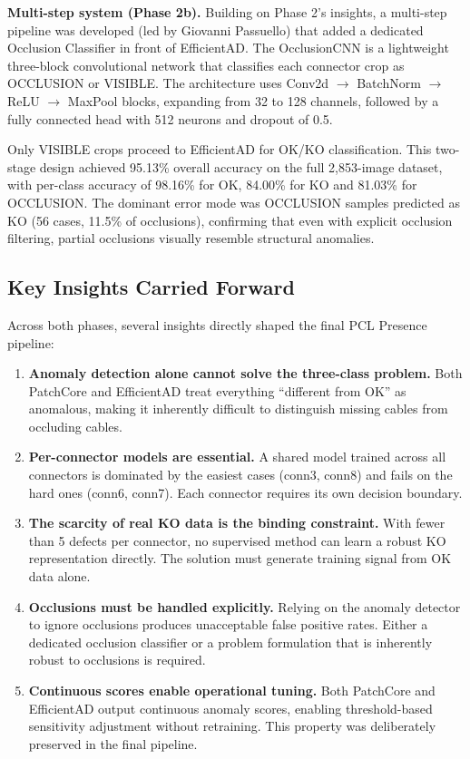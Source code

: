 \documentclass[11pt,a4paper]{article}
\begin{document}
\textbf{Multi-step system (Phase 2b).} Building on Phase 2's insights, a multi-step pipeline was developed (led by Giovanni Passuello) that added a dedicated Occlusion Classifier in front of EfficientAD. The OcclusionCNN is a lightweight three-block convolutional network that classifies each connector crop as OCCLUSION or VISIBLE. The architecture uses Conv2d $\to$ BatchNorm $\to$ ReLU $\to$ MaxPool blocks, expanding from 32 to 128 channels, followed by a fully connected head with 512 neurons and dropout of 0.5. 

Only VISIBLE crops proceed to EfficientAD for OK/KO classification. This two-stage design achieved 95.13\% overall accuracy on the full 2{,}853-image dataset, with per-class accuracy of 98.16\% for OK, 84.00\% for KO and 81.03\% for OCCLUSION. The dominant error mode was OCCLUSION samples predicted as KO (56 cases, 11.5\% of occlusions), confirming that even with explicit occlusion filtering, partial occlusions visually resemble structural anomalies.

\subsection{Key Insights Carried Forward}

Across both phases, several insights directly shaped the final PCL Presence pipeline:

\begin{enumerate}[nosep]
    \item \textbf{Anomaly detection alone cannot solve the three-class problem.} Both PatchCore and EfficientAD treat everything ``different from OK'' as anomalous, making it inherently difficult to distinguish missing cables from occluding cables.
    \item \textbf{Per-connector models are essential.} A shared model trained across all connectors is dominated by the easiest cases (conn3, conn8) and fails on the hard ones (conn6, conn7). Each connector requires its own decision boundary.
    \item \textbf{The scarcity of real KO data is the binding constraint.} With fewer than 5 defects per connector, no supervised method can learn a robust KO representation directly. The solution must generate training signal from OK data alone.
    \item \textbf{Occlusions must be handled explicitly.} Relying on the anomaly detector to ignore occlusions produces unacceptable false positive rates. Either a dedicated occlusion classifier or a problem formulation that is inherently robust to occlusions is required.
    \item \textbf{Continuous scores enable operational tuning.} Both PatchCore and EfficientAD output continuous anomaly scores, enabling threshold-based sensitivity adjustment without retraining. This property was deliberately preserved in the final pipeline.
\end{enumerate}
\end{document}

